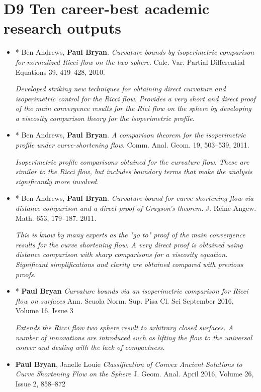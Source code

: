 \documentclass[12pt]{article}
\author{Paul Bryan}
\date{}
\title{}
\begin{document}
\section*{D9 Ten career-best academic research outputs}
\label{sec:orgec3e35a}

\begin{itemize}
\item * Ben Andrews, \textbf{Paul Bryan}. \emph{Curvature bounds by isoperimetric comparison for normalized Ricci flow on the two-sphere}. Calc. Var. Partial Differential Equations 39, 419--428, 2010.

\emph{Developed striking new techniques for obtaining direct curvature and isoperimetric control for the Ricci flow. Provides a very short and direct proof of the main convergence results for the Rici flow on the sphere by developing a viscosity comparison theory for the isoperimetric profile.}

\item * Ben Andrews, \textbf{Paul Bryan}. \emph{A comparison theorem for the isoperimetric profile under curve-shortening flow}. Comm. Anal. Geom. 19, 503--539, 2011.

\emph{Isoperimetric profile comparisons obtained for the curvature flow. These are similar to the Ricci flow, but includes boundary terms that make the analysis significantly more involved.}

\item * Ben Andrews, \textbf{Paul Bryan}. \emph{Curvature bound for curve shortening flow via distance comparison and a direct proof of Grayson's theorem}. J. Reine Angew. Math. 653, 179--187. 2011.

\emph{This is know by many experts as the "go to" proof of the main convergence results for the curve shortening flow. A very direct proof is obtained using distance comparison with sharp comparisons for a viscosity equation. Significant simplifications and clarity are obtained compared with previous proofs.}

\item * \textbf{Paul Bryan} \emph{Curvature bounds via an isoperimetric comparison for Ricci flow on surfaces} Ann. Scuola Norm. Sup. Pisa Cl. Sci September 2016, Volume 16, Issue 3

\emph{Extends the Ricci flow two sphere result to arbitrary closed surfaces. A number of innovations are introduced such as lifting the flow to the universal conver and dealing with the lack of compactness.}

\item \textbf{Paul Bryan}, Janelle Louie \emph{Classification of Convex Ancient Solutions to Curve Shortening Flow on the Sphere} J. Geom. Anal. April 2016, Volume 26, Issue 2, 858--872


\end{itemize}
\end{document}
